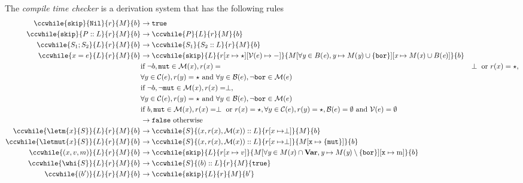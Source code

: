 \begin{definition}
\label{compiletimecheckerwhile}
The \emph{compile time checker} is a derivation system that has the following rules
\begin{align*}
\ccwhile{\texttt{skip}}{\texttt{Nil}}{r}{M}{b} & \to \texttt{true}  \\
\ccwhile{\texttt{skip}}{P::L}{r}{M}{b}      & \to \ccwhile{P}{L}{r}{M}{b}  \\
\ccwhile{S_1; S_2}{L}{r}{M}{b}                 & \to \ccwhile{S_1}{S_2::L}{r}{M}{b}  \\
\ccwhile{x=e}{L}{r}{M}{b}                    & \to \ccwhile{\texttt{skip}}{L}{r[x\mapsto \star][\mathcal{V}(e) \mapsto -]}{M[\forall \textit{y} \in B(\textit{e}), \textit{y}\mapsto M(\textit{y})\cup \{\texttt{bor} \} ][\textit{x} \mapsto M(\textit{x}) \cup B(\textit{e})]}{b} \\
                                    & \textrm{if } \neg b, \texttt{mut} \in \mathcal{M}(x), r(x) = & \perp \textrm{ or } r(x) = \star, \\ &  \forall y \in \mathcal{C}(e), r(y) = \star \textrm{ and } \forall y \in \mathcal{B}(e), \neg \texttt{bor} \in \mathcal{M}(e) \\
                                    & \textrm{if } \neg b, \neg \texttt{mut} \in \mathcal{M}(x),  r(x) = \perp,  \\ & \forall y \in \mathcal{C}(e), r(y) = \star \textrm{ and } \forall y \in \mathcal{B}(e), \neg \texttt{bor} \in \mathcal{M}(e) \\
                                    & \textrm{if } b, \texttt{mut} \in \mathcal{M}(x), r(x) = \perp \textrm{ or } r(x) = \star, \forall y \in \mathcal{C}(e), r(y) = \star, \mathcal{B}(e) = \emptyset \textrm{ and } \mathcal{V}(e) = \emptyset \\
                                    & \to \texttt{false} \textrm{ otherwise}\\
\ccwhile{\letm{x}{S}}{L}{r}{M}{b} & \to \ccwhile{S}{(x,r(x),\mathcal{M}(x))::L}{r[x\mapsto \perp]}{M}{b} \\
\ccwhile{\letmut{x}{S}}{L}{r}{M}{b} & \to \ccwhile{S}{(x,r(x),\mathcal{M}(x))::L}{r[x\mapsto \perp]}{M[\texttt{x}\mapsto\{\texttt{mut}\}]}{b} \\
\ccwhile{(x,v,m)}{L}{r}{M}{b}                    & \to \ccwhile{\texttt{skip}}{L}{r[x \mapsto v]}{M[\forall \textit{y} \in M(\textit{x})\cap\textbf{Var}, \textit{y} \mapsto M(\textit{y}) \setminus \{\texttt{bor}\}][\texttt{x} \mapsto \textrm{m}]}{b} \\
\ccwhile{\whi{S}}{L}{r}{M}{b} & \to \ccwhile{S}{(b)::L}{r}{M}{\texttt{true}} \\
\ccwhile{(b')}{L}{r}{M}{b} & \to \ccwhile{\texttt{skip}}{L}{r}{M}{b'}
\end{align*}
\end{definition}

